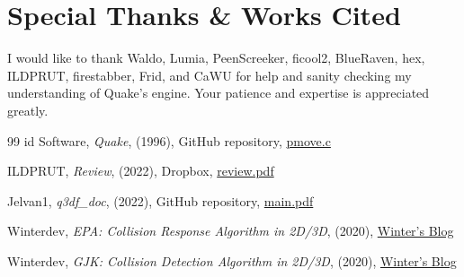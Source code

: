 \documentclass{article}
\begin{document}
\part{Special Thanks \& Works Cited}
I would like to thank Waldo, Lumia, PeenScreeker, ficool2, BlueRaven, hex, ILDPRUT, firestabber, Frid, and CaWU for help and sanity checking my understanding of Quake's engine. Your patience and expertise is appreciated greatly. 
\begin{thebibliography}{99}
id Software, \emph{Quake}, (1996), GitHub repository, \href{https://github.com/id-Software/Quake/blob/master/QW/client/pmove.c}{pmove.c}

ILDPRUT, \emph{Review}, (2022), Dropbox, \href{https://www.dropbox.com/s/jr00chyg20vuibd/Review.pdf?dl=0}{review.pdf}

Jelvan1, \emph{q3df\_doc}, (2022), GitHub repository, \href{https://github.com/Jelvan1/q3df\_doc}{main.pdf}

Winterdev, \emph{EPA: Collision Response Algorithm in 2D/3D}, (2020), \href{https://blog.winter.dev/2020/epa-algorithm/}{Winter's Blog}

Winterdev, \emph{GJK: Collision Detection Algorithm in 2D/3D}, (2020), \href{https://blog.winter.dev/2020/gjk-algorithm/}{Winter's Blog}
\end{thebibliography}
\end{document}
